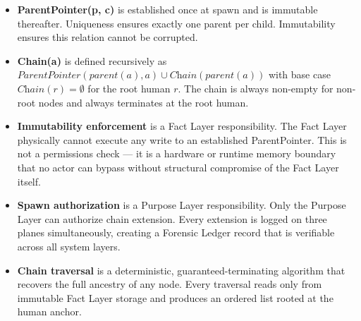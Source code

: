 \begin{itemize}[noitemsep]
    \item \textbf{ParentPointer(p, c)} is established once at spawn and is immutable thereafter. Uniqueness ensures exactly one parent per child. Immutability ensures this relation cannot be corrupted.
    \item \textbf{Chain(a)} is defined recursively as $\textit{ParentPointer}(\textit{parent}(a), a) \cup \textit{Chain}(\textit{parent}(a))$ with base case $\textit{Chain}(r) = \emptyset$ for the root human $r$. The chain is always non-empty for non-root nodes and always terminates at the root human.
    \item \textbf{Immutability enforcement} is a Fact Layer responsibility. The Fact Layer physically cannot execute any write to an established ParentPointer. This is not a permissions check --- it is a hardware or runtime memory boundary that no actor can bypass without structural compromise of the Fact Layer itself.
    \item \textbf{Spawn authorization} is a Purpose Layer responsibility. Only the Purpose Layer can authorize chain extension. Every extension is logged on three planes simultaneously, creating a Forensic Ledger record that is verifiable across all system layers.
    \item \textbf{Chain traversal} is a deterministic, guaranteed-terminating algorithm that recovers the full ancestry of any node. Every traversal reads only from immutable Fact Layer storage and produces an ordered list rooted at the human anchor.
\end{itemize}
